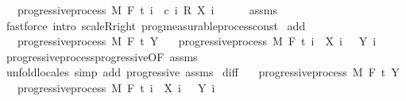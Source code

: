\begin{isabellebody}
\ \ \ {\isachardoublequoteopen}progressive{\isacharunderscore}{\kern0pt}process\ M\ F\ t\ {\isacharparenleft}{\kern0pt}{\isasymlambda}i\ {\isasymxi}{\isachardot}{\kern0pt}\ c\ i\ {\isacharasterisk}{\kern0pt}\isactrlsub R\ {\isacharparenleft}{\kern0pt}X\ i\ {\isasymxi}{\isacharparenright}{\kern0pt}{\isacharparenright}{\kern0pt}{\isachardoublequoteclose}\ \isanewline
%
\isadelimproof
\ \ %
\endisadelimproof
%
\isatagproof
{}\isamarkupfalse%
\ assms\ \isamarkupfalse%
\ {\isacharparenleft}{\kern0pt}fastforce\ intro{\isacharcolon}{\kern0pt}\ scaleR{\isacharunderscore}{\kern0pt}right\ prog{\isacharunderscore}{\kern0pt}measurable{\isacharunderscore}{\kern0pt}process{\isacharunderscore}{\kern0pt}const{\isacharparenright}{\kern0pt}%
\endisatagproof
{\isafoldproof}%
%
\isadelimproof
\isanewline
%
\endisadelimproof
\isanewline
{}\isamarkupfalse%
\ add{\isacharcolon}{\kern0pt}\isanewline
\ \ \ {\isachardoublequoteopen}progressive{\isacharunderscore}{\kern0pt}process\ M\ F\ t\ Y{\isachardoublequoteclose}\isanewline
\ \ \ {\isachardoublequoteopen}progressive{\isacharunderscore}{\kern0pt}process\ M\ F\ t\ {\isacharparenleft}{\kern0pt}{\isasymlambda}i\ {\isasymxi}{\isachardot}{\kern0pt}\ X\ i\ {\isasymxi}\ {\isacharplus}{\kern0pt}\ Y\ i\ {\isasymxi}{\isacharparenright}{\kern0pt}{\isachardoublequoteclose}\isanewline
%
\isadelimproof
\ \ %
\endisadelimproof
%
\isatagproof
{}\isamarkupfalse%
\ progressive{\isacharunderscore}{\kern0pt}process{\isachardot}{\kern0pt}progressive{\isacharbrackleft}{\kern0pt}OF\ assms{\isacharbrackright}{\kern0pt}\ \isamarkupfalse%
\ {\isacharparenleft}{\kern0pt}unfold{\isacharunderscore}{\kern0pt}locales{\isacharparenright}{\kern0pt}\ {\isacharparenleft}{\kern0pt}simp\ add{\isacharcolon}{\kern0pt}\ progressive\ assms{\isacharparenright}{\kern0pt}%
\endisatagproof
{\isafoldproof}%
%
\isadelimproof
\isanewline
%
\endisadelimproof
\isanewline
{}\isamarkupfalse%
\ diff{\isacharcolon}{\kern0pt}\isanewline
\ \ \ {\isachardoublequoteopen}progressive{\isacharunderscore}{\kern0pt}process\ M\ F\ t\ Y{\isachardoublequoteclose}\isanewline
\ \ \ {\isachardoublequoteopen}progressive{\isacharunderscore}{\kern0pt}process\ M\ F\ t\ {\isacharparenleft}{\kern0pt}{\isasymlambda}i\ {\isasymxi}{\isachardot}{\kern0pt}\ X\ i\ {\isasymxi}\ {\isacharminus}{\kern0pt}\ Y\ i\ {\isasymxi}{\isacharparenright}{\kern0pt}{\isachardoublequoteclose}\isanewline

\end{isabellebody}
